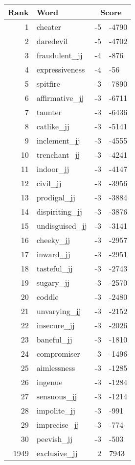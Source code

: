 \begin{longtable}[!htbp]{| rlr@{.}l |}
    \hline
    \textbf{Rank} & \textbf{Word} & \multicolumn{2}{c|}{\textbf{Score}} \\
    \hline
    \endhead
    1 & cheater & -5 & -4790 \\
    2 & daredevil & -5 & -4702 \\
    3 & fraudulent\_jj & -4 & -876 \\
    4 & expressiveness & -4 & -56 \\
    5 & spitfire & -3 & -7890 \\
    6 & affirmative\_jj & -3 & -6711 \\
    7 & taunter & -3 & -6436 \\
    8 & catlike\_jj & -3 & -5141 \\
    9 & inclement\_jj & -3 & -4555 \\
    10 & trenchant\_jj & -3 & -4241 \\
    11 & indoor\_jj & -3 & -4147 \\
    12 & civil\_jj & -3 & -3956 \\
    13 & prodigal\_jj & -3 & -3884 \\
    14 & dispiriting\_jj & -3 & -3876 \\
    15 & undisguised\_jj & -3 & -3141 \\
    16 & cheeky\_jj & -3 & -2957 \\
    17 & inward\_jj & -3 & -2951 \\
    18 & tasteful\_jj & -3 & -2743 \\
    19 & sugary\_jj & -3 & -2570 \\
    20 & coddle & -3 & -2480 \\
    21 & unvarying\_jj & -3 & -2152 \\
    22 & insecure\_jj & -3 & -2026 \\
    23 & baneful\_jj & -3 & -1810 \\
    24 & compromiser & -3 & -1496 \\
    25 & aimlessness & -3 & -1285 \\
    26 & ingenue & -3 & -1284 \\
    27 & sensuous\_jj & -3 & -1214 \\
    28 & impolite\_jj & -3 & -991 \\
    29 & imprecise\_jj & -3 & -774 \\
    30 & peevish\_jj & -3 & -503 \\
    1949 & exclusive\_jj & 2 & 7943 \\

\end{longtable}
